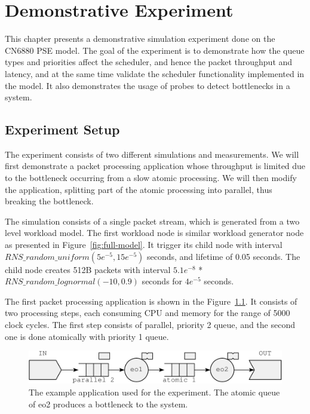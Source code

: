 \chapter{Demonstrative Experiment}
\label{chapter:demonstrative-experiment}

This chapter presents a demonstrative simulation experiment done on the CN6880 PSE model. The goal of the experiment is to demonstrate how the queue types and priorities affect the scheduler, and hence the packet throughput and latency, and at the same time validate the scheduler functionality implemented in the model. It also demonstrates the usage of probes to detect bottlenecks in a system.

\section{Experiment Setup}
\label{sec:experiment-setup}

The experiment consists of two different simulations and measurements. We will first demonstrate a packet processing application whose throughput is limited due to the bottleneck occurring from a slow atomic processing. We will then modify the application, splitting part of the atomic processing into parallel, thus breaking the bottleneck.

The simulation consists of a single packet stream, which is generated from a two level workload model. The first workload node is similar workload generator node as presented in Figure~\ref{fig:full-model}. It trigger its child node with interval $RNS\_random\_uniform(5e^{-5}, 15e^{-5})$ seconds, and lifetime of 0.05 seconds. The child node creates 512B packets with interval $5.1e^{-8}$ * $RNS\_random\_lognormal(-10, 0.9)$ seconds for $4e^{-5}$ seconds.

The first packet processing application is shown in the Figure~\ref{fig:application-1}. It consists of two processing steps, each consuming CPU and memory for the range of 5000 clock cycles. The first step consists of parallel, priority 2 queue, and the second one is done atomically with priority 1 queue.

\begin{figure}[]
  \begin{center}
    \includegraphics[width=\textwidth]{images/application-1.pdf}
    \caption{The example application used for the experiment. The atomic queue of eo2 produces a bottleneck to the system.}
    \label{fig:application-1}
  \end{center}
\end{figure}

